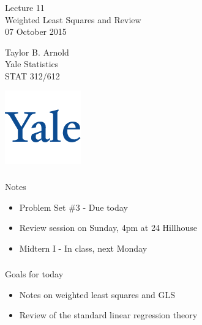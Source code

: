 



\begin{frame}[fragile] \frametitle{}

\vfill

{\fontsize{0.7cm}{0cm}\selectfont Lecture 11 \\\vspace{0.2cm}
Weighted Least Squares and Review}\\\vspace{0.5cm}
07 October 2015

\vspace{2cm}

\begin{minipage}{0.6\textwidth}
Taylor B. Arnold \\
Yale Statistics \\
STAT 312/612
\end{minipage}
\hfill
\begin{minipage}{0.3\textwidth}\raggedleft
\includegraphics[scale=0.3]{../yale-logo.png}
\end{minipage}%

\end{frame}

\begin{frame}[fragile] \frametitle{}

{\color{yaleblue}\fontsize{16pt}{20pt}\selectfont Notes}

\begin{itemize}
\item Problem Set \#3 - Due today
\item Review session on Sunday, 4pm at 24 Hillhouse
\item Midtern I - In class, next Monday
\end{itemize}

\end{frame}

\begin{frame}[fragile] \frametitle{}

{\color{yaleblue}\fontsize{16pt}{20pt}\selectfont Goals for today}

\begin{itemize}
\item Notes on weighted least squares and GLS
\item Review of the standard linear regression theory
\end{itemize}

\end{frame}

